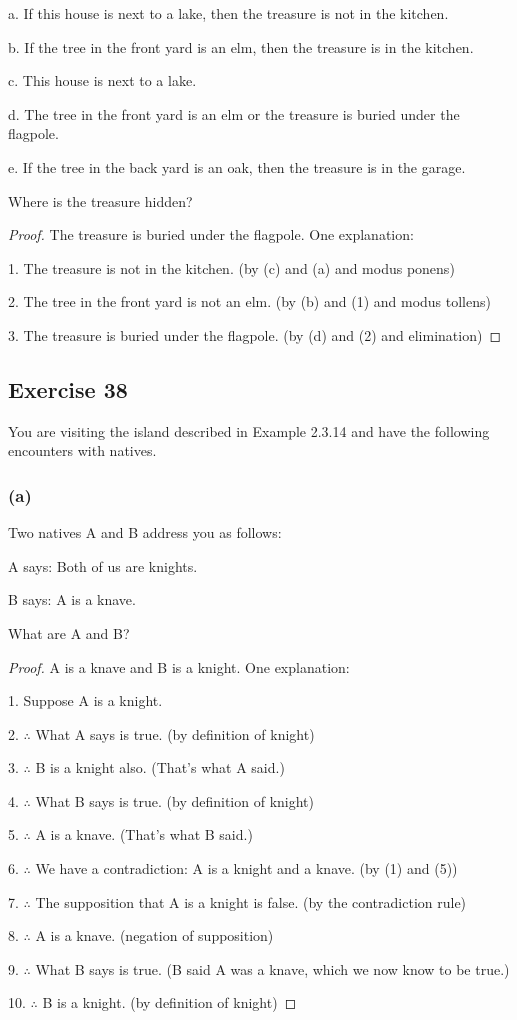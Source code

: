 \documentclass[14pt]{extarticle}
\begin{document}
a. If this house is next to a lake, then the treasure is not in the kitchen.

b. If the tree in the front yard is an elm, then the treasure is in the kitchen.

c. This house is next to a lake.

d. The tree in the front yard is an elm or the treasure is buried under the flagpole.

e. If the tree in the back yard is an oak, then the treasure is in the garage.

Where is the treasure hidden?

\begin{proof}
    The treasure is buried under the flagpole. One explanation:

    1. The treasure is not in the kitchen. (by (c) and (a) and modus ponens)

    2. The tree in the front yard is not an elm. (by (b) and (1) and modus tollens)

    3. The treasure is buried under the flagpole. (by (d) and (2) and elimination)
\end{proof}

\subsection{Exercise 38}
You are visiting the island described in Example 2.3.14 and have the following encounters with natives.

\subsubsection{(a)}
Two natives A and B address you as follows:

A says: Both of us are knights.

B says: A is a knave.

What are A and B?

\begin{proof}
    A is a knave and B is a knight. One explanation:

    1. Suppose A is a knight.

    2. $\therefore$ What A says is true. (by definition of knight)

    3. $\therefore$ B is a knight also. (That’s what A said.)

    4. $\therefore$ What B says is true. (by definition of knight)

    5. $\therefore$ A is a knave. (That’s what B said.)

    6. $\therefore$ We have a contradiction: A is a knight and a knave. (by (1) and (5))

    7. $\therefore$ The supposition that A is a knight is false. (by the contradiction rule)

    8. $\therefore$ A is a knave. (negation of supposition)

    9. $\therefore$ What B says is true. (B said A was a knave, which we now know to be true.)

    10. $\therefore$ B is a knight. (by definition of knight) \end{proof}
\end{document}
